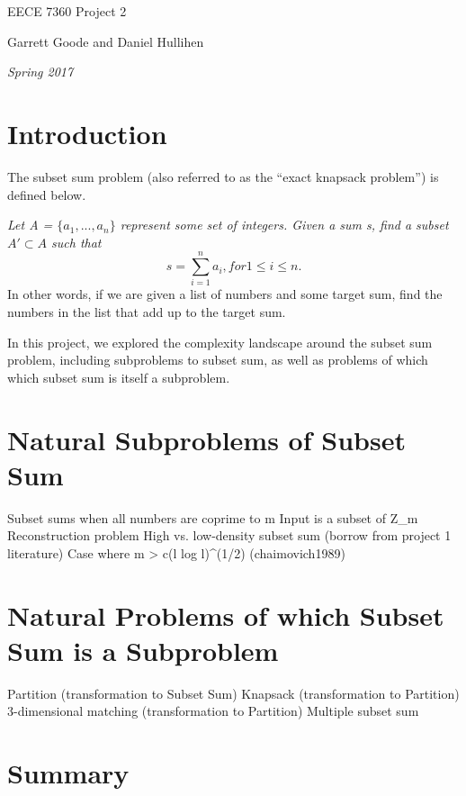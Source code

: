 \documentclass{article}
\begin{document}
\centerline{\sc \large EECE 7360 Project 2}
\vspace{.5pc}
\centerline{\sc Garrett Goode and Daniel Hullihen}
\centerline{\it Spring 2017}

\section{Introduction}
The subset sum problem (also referred to as the ``exact knapsack problem'')
is defined below.

\textit{Let A = $\{a_1, ..., a_n\}$ represent some set of integers. Given a sum s, find a subset $A' \subset A$ such that
  $$s = \sum_{i=1}^n a_i, for 1 \le i \le n.$$}
In other words, if we are given a list of numbers and some target sum, find the numbers in the list that
add up to the target sum. 

In this project, we explored the complexity landscape around the subset sum problem, including
subproblems to subset sum, as well as problems of which which subset sum is itself a subproblem.

\section{Natural Subproblems of Subset Sum}
Subset sums when all numbers are coprime to m
Input is a subset of Z_m
Reconstruction problem
High vs. low-density subset sum (borrow from project 1 literature)
Case where m > c(l log l)^(1/2) (chaimovich1989)

\section{Natural Problems of which Subset Sum is a Subproblem}
Partition (transformation to Subset Sum)
Knapsack (transformation to Partition)
3-dimensional matching (transformation to Partition)
Multiple subset sum 

\section{Summary}



\end{document}
